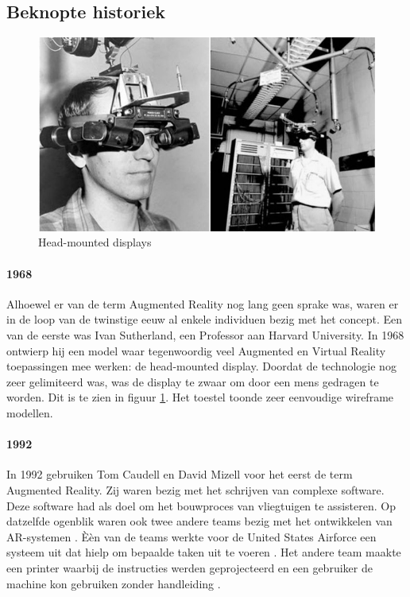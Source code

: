 \documentclass[pdftex,a4paper,12pt,twoside]{report}
\begin{document}
\subsection{Beknopte historiek}
\begin{figure}
\vspace{-15pt}
\caption{Head-mounted displays \citep{history2}} \label{fig:sutherlandimg}
\includegraphics[scale=0.25]{sutherland}
\vspace{10pt}
\end{figure}

\paragraph{1968} Alhoewel er van de term Augmented Reality nog lang geen sprake was, waren er in de loop van de twinstige eeuw al enkele individuen bezig met het concept. Een van de eerste was Ivan Sutherland, een Professor aan Harvard University. In 1968 ontwierp hij een model waar tegenwoordig veel Augmented en Virtual Reality toepassingen mee werken: de head-mounted display. Doordat de technologie nog zeer gelimiteerd was, was de display te zwaar om door een mens gedragen te worden. Dit is te zien in figuur \ref{fig:sutherlandimg}. Het toestel toonde zeer eenvoudige wireframe modellen.

\paragraph{1992} In 1992 gebruiken Tom Caudell en David Mizell voor het eerst de term Augmented Reality. Zij waren bezig met het schrijven van complexe software. Deze software had als doel om het bouwproces van vliegtuigen te assisteren. Op datzelfde ogenblik waren ook twee andere teams bezig met het ontwikkelen van AR-systemen \citep{history}. \`E\`en van de teams werkte voor de United States Airforce een systeem uit dat hielp om bepaalde taken uit te voeren \citep{rosenberg}.
 Het andere team maakte een printer waarbij de instructies werden geprojecteerd en een gebruiker de machine kon gebruiken zonder handleiding \citep{history}.
\end{document}
